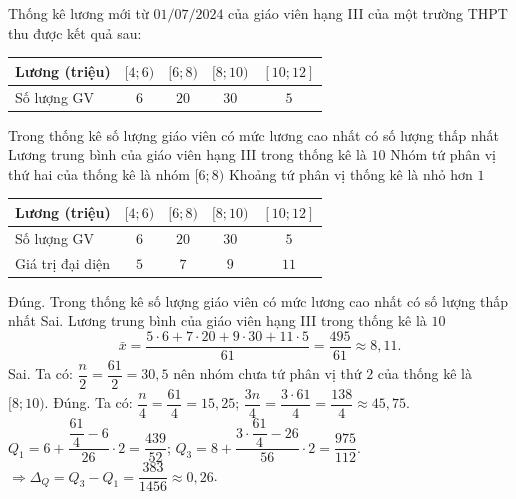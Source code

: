 \begin{ex}%
	Thống kê lương mới từ $01/07/2024$ của giáo viên hạng III của một trường THPT thu được kết quả sau:
	\begin{center}
		\begin{tabular}{|l|c|c|c|c|}
			\hline
			Lương (triệu) & $[4;6)$ & $[6;8)$ & $[8;10)$ & $[10;12]$\\
			\hline
			Số lượng GV & $6$ & $20$ & $30$ & $5$\\
			\hline
		\end{tabular}
	\end{center}
	\choiceTF
	{\True Trong thống kê số lượng giáo viên có mức lương cao nhất có số lượng thấp nhất}
	{Lương trung bình của giáo viên hạng III trong thống kê là $10$}
	{Nhóm tứ phân vị thứ hai của thống kê là nhóm $[6;8)$}
	{\True Khoảng tứ phân vị thống kê là nhỏ hơn $1$}
	\loigiai
	{
		\begin{center}
			\begin{tabular}{|l|c|c|c|c|}
				\hline
				Lương (triệu) & $[4;6)$ & $[6;8)$ & $[8;10)$ & $[10;12]$\\
				\hline
				Số lượng GV & $6$ & $20$ & $30$ & $5$\\
				\hline
				Giá trị đại diện & $5$ & $7$ & $9$ & $11$\\
				\hline
			\end{tabular}
		\end{center}
		\begin{itemchoice}
			\itemch Đúng. Trong thống kê số lượng giáo viên có mức lương cao nhất có số lượng thấp nhất
			\itemch Sai. Lương trung bình của giáo viên hạng III trong thống kê là $10$
			$$
			\bar{x}=\dfrac{5\cdot 6+7\cdot 20+9\cdot 30+11\cdot 5}{61}=\dfrac{495}{61} \approx 8{,}11.
			$$
			\itemch Sai. Ta có: $\dfrac{n}{2}=\dfrac{61}{2}=30{,}5$ nên nhóm chưa tứ phân vị thứ $2$ của thống kê là $[8;10)$.
			\itemch Đúng. Ta có: $\dfrac{n}{4}=\dfrac{61}{4}=15{,}25$; $\dfrac{3n}{4}=\dfrac{3\cdot 61}{4}=\dfrac{138}{4} \approx 45{,}75$.\\
			$Q_1=6+\dfrac{\dfrac{61}{4}-6}{26} \cdot 2=\dfrac{439}{52}$; $Q_3=8+\dfrac{3 \cdot \dfrac{61}{4}-26}{56} \cdot 2=\dfrac{975}{112}$.\\
			$\Rightarrow \Delta_Q=Q_3-Q_1=\dfrac{383}{1456} \approx 0{,}26$.
		\end{itemchoice}
	}
\end{ex}

